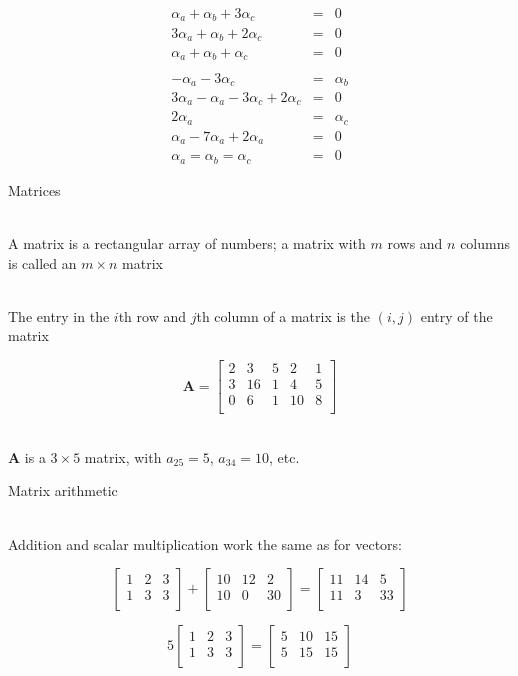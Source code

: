 \documentclass[10pt]{seminar}
\begin{document}
\begin{slide}
$$\begin{array}{rcl}
\alpha_a+\alpha_b+3\alpha_c&=&0 \\
3\alpha_a+\alpha_b+2\alpha_c&=&0 \\
\alpha_a+\alpha_b+\alpha_c&=&0\\
\\
-\alpha_a-3\alpha_c&=&\alpha_b \\
3\alpha_a -\alpha_a-3\alpha_c +2\alpha_c&=&0\\
2\alpha_a&=&\alpha_c\\
\alpha_a-7\alpha_a+2\alpha_a&=&0\\
\alpha_a=\alpha_b=\alpha_c&=&0
\end{array}
$$

\newslide
Matrices

\ \\A matrix is a rectangular array of numbers; a matrix with $m$ rows and $n$ columns is called an $m\times n$ matrix

\ \\The entry in the $i$th row and $j$th  column of a matrix is the $(i, j)$ entry of the matrix

$$
\mathbf{A}=\begin{bmatrix}
2 & 3&  5&  2&  1\\
3 &16 & 1  &4  &5\\
0 &6 &1 &10&8\\
\end{bmatrix}
$$

\ \\$\mathbf{A}$ is a $3\times 5$ matrix, with $a_{25}=5$, $a_{34}=10$, etc.

\newslide
Matrix arithmetic

\ \\Addition and scalar multiplication work the same as for vectors:

$$
\begin{bmatrix}
1&2&3\\
1&3&3\\
\end{bmatrix}
+
\begin{bmatrix}
10&12&2\\
10&0&30\\
\end{bmatrix}
=
\begin{bmatrix}
11&14&5\\
11&3&33\\
\end{bmatrix}$$

$$
5\begin{bmatrix}
1&2&3\\
1&3&3\\
\end{bmatrix}
=
\begin{bmatrix}
5&10&15\\
5&15&15\\
\end{bmatrix}
$$


\end{slide}
\end{document}
